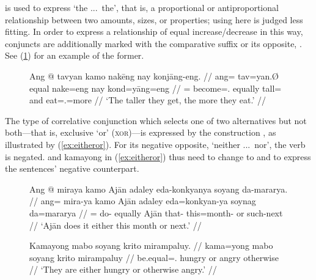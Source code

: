  is used to express `the ...\ the', that is, a 
proportional or antiproportional relationship between two amounts, sizes, 
or properties; using  here is judged less fitting. In 
order to express a relationship of equal increase/decrease in this way, 
conjuncts are additionally marked with the comparative suffix 
 or its opposite, . See
(\ref{ex:thethe}) for an example of the former.

\begin{figure}[h]
\ex\label{ex:thethe}
\begingl
	\gla Ang @ tavyan kamo nakēng nay konjāng-eng. //
	\glb ang= tav=yan.Ø equal nake=eng nay kond=yāng=eng //
	\glc \AgtT{}= become=\TsgM{}.\Top{} equally tall=\Comp{} and 
		eat=\TsgM{}.\Aarg{}=more //
	\glft `The taller they get, the more they eat.' //
\endgl
\xe
\end{figure}

The type of correlative conjunction which selects one of two alternatives but
not both---that is, exclusive `or' (\textsc{xor})---is expressed by the
construction , as
illustrated by (\ref{ex:eitheror}). For its negative opposite, `neither ...\
nor', the verb is negated.  and 
{kamayong} in (\ref{ex:eitheror}) thus need to change to \rayr{mirojy}{miroyya}
and \rayr{kmojyoNF}{kamoyyong} to express the sentences' negative counterpart.

\begin{figure}[h]
\pex\label{ex:eitheror}
\a\label{ex:eitherorvb}\begingl
	\gla Ang @ miraya kamo Ajān adaley eda-konkyanya soyang da-mararya. //
	\glb ang= mira-ya kamo Ajān adaley eda=konkyan-ya soynag da=mararya //
	\glc \AgtT{}= do-\TsgM{} equally Ajān that-\PargI{} this=month-\Loc{} 
		or such-next //
	\glft `Ajān does it either this month or next.' //
\endgl

\a\label{ex:eitherorpred}\begingl
	\gla Kamayong mabo soyang krito mirampaluy. //
	\glb kama=yong mabo soyang krito mirampaluy //
	\glc be.equal=\TsgN{}.\Aarg{} hungry or angry otherwise //
	\glft `They are either hungry or otherwise angry.' //
\endgl

\xe
\end{figure}



